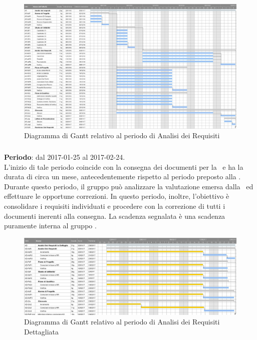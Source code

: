 		\begin{figure}[H]
			\centering
			\includegraphics[angle=90,scale=0.37]{img/ganttnetbreak1.png}
			\caption{Diagramma di Gantt relativo al periodo di Analisi dei Requisiti}
		\end{figure}
		
		\subsubsection{\ARD}
		\textbf{Periodo}: dal 2017-01-25 al 2017-02-24.\\
		L'inizio di tale periodo coincide con la consegna dei documenti per la \RR\ e ha la durata di circa un mese, antecedentemente rispetto al periodo preposto alla \PA. Durante questo periodo, il gruppo può analizzare la valutazione emersa dalla \RR\ ed effettuare le opportune correzioni. In questo periodo, inoltre, l'obiettivo è consolidare i requisiti individuati e procedere con la correzione di tutti i documenti inerenti alla consegna. La scadenza segnalata è una scadenza puramente interna al gruppo \textit{\gruppo}.
		
		\begin{figure}[H]
			\centering
			\includegraphics[scale=0.3]{img/ganttnetbreak2.png}
			\caption{Diagramma di Gantt relativo al periodo di Analisi dei Requisiti Dettagliata}
		\end{figure}
		
